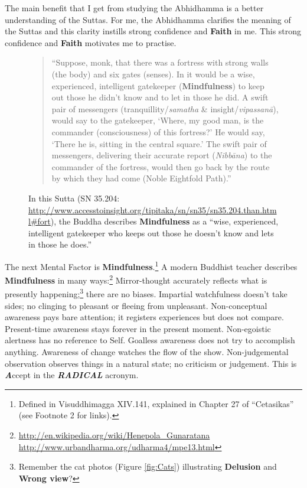 The main benefit that I get from studying the Abhidhamma is a better understanding of the Suttas. For me, the Abhidhamma clarifies the meaning of the Suttas and this clarity instills strong confidence and \textbf{Faith} in me. This strong confidence and \textbf{Faith} motivates me to practise.

\begin{figure}[H]
\centering

\begin{quote}
“Suppose, monk, that there was a fortress with strong walls (the body) and six gates (senses). In it would be a wise, experienced, intelligent gatekeeper (\textbf{Mindfulness}) to keep out those he didn't know and to let in those he did. A swift pair of messengers (tranquillity/\textit{samatha} \& insight/\textit{vipassanā}), would say to the gatekeeper, ‘Where, my good man, is the commander (consciousness) of this fortress?’ He would say, ‘There he is, sitting in the central square.’ The swift pair of messengers, delivering their accurate report (\textit{Nibbāna}) to the commander of the fortress, would then go back by the route by which they had come (Noble Eightfold Path).”
\end{quote}
\caption{In this Sutta (SN 35.204: \url{http://www.accesstoinsight.org/tipitaka/sn/sn35/sn35.204.than.html\#fort}), the Buddha describes \textbf{Mindfulness} as a “wise, experienced, intelligent gatekeeper who keeps out those he doesn’t know and lets in those he does.”}
\label{fig:Fortress}
\end{figure}

\pagebreak

The next Mental Factor is \textbf{Mindfulness}.\footnote{Defined in Visuddhimagga XIV.141, explained in Chapter 27 of “Cetasikas” (see Footnote 2 for links).} A modern Buddhist teacher describes \textbf{Mindfulness} in many ways:\footnote{\url{http://en.wikipedia.org/wiki/Henepola_Gunaratana} \\ \url{http://www.urbandharma.org/udharma4/mpe13.html}} Mirror-thought accurately reflects what is presently happening;\footnote{Remember the cat photos (Figure \ref{fig:Cats}) illustrating \textbf{Delusion} and \textbf{Wrong view}?} there are no biases. Impartial watchfulness doesn’t take sides; no clinging to pleasant or fleeing from unpleasant. Non-conceptual awareness pays bare attention; it registers experiences but does not compare. Present-time awareness stays forever in the present moment. Non-egoistic alertness has no reference to Self. Goalless awareness does not try to accomplish anything. Awareness of change watches the flow of the show. Non-judgemental observation observes things in a natural state; no criticism or judgement. This is \textbf{\textit{A}}ccept in the \textbf{\textit{RADICAL}} acronym.

